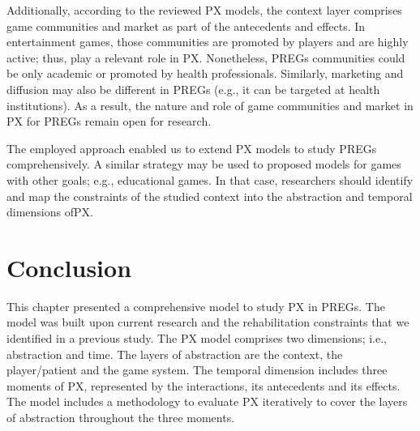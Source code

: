 Additionally, according to the reviewed \ac{PX} models, the context layer comprises game communities and market as part of the antecedents and effects. In entertainment games, those communities are promoted by players and are highly active; thus, play a relevant role in \ac{PX}. Nonetheless, \acp{PREG} communities could be only academic or promoted by health professionals. Similarly, marketing and diffusion may also be different in \acp{PREG} (e.g., it can be targeted at health institutions). As a result, the nature and role of game communities and market in \ac{PX} for \acp{PREG} remain open for research.

The employed approach enabled us to extend \ac{PX} models to study \acp{PREG} comprehensively. A similar strategy may be used to proposed models for games with other goals; e.g., educational games. In that case, researchers should identify and map the constraints of the studied context into the abstraction and temporal dimensions of\ac{PX}.

\section{Conclusion} %
\label{sec:conclusion_model}

This chapter presented a comprehensive model to study \ac{PX} in \acp{PREG}. The model was built upon current research and the rehabilitation constraints that we identified in a previous study. The \ac{PX} model comprises two dimensions; i.e., abstraction and time. The layers of abstraction are the context, the player/patient and the game system. The temporal dimension includes three moments of \ac{PX}, represented by the interactions, its antecedents and its effects. The model includes a methodology to evaluate \ac{PX} iteratively to cover the layers of abstraction throughout the three moments.